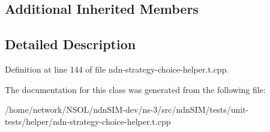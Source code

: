\subsection*{Additional Inherited Members}


\subsection{Detailed Description}


Definition at line 144 of file ndn-\/strategy-\/choice-\/helper.\+t.\+cpp.



The documentation for this class was generated from the following file\+:\begin{DoxyCompactItemize}
\item 
/home/network/\+N\+S\+O\+L/ndn\+S\+I\+M-\/dev/ns-\/3/src/ndn\+S\+I\+M/tests/unit-\/tests/helper/ndn-\/strategy-\/choice-\/helper.\+t.\+cpp\end{DoxyCompactItemize}
